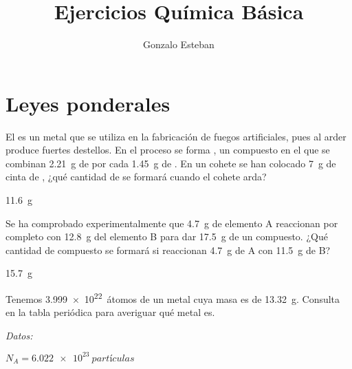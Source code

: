 \documentclass[10pt,a5paper,twoside]{article}
\title{Ejercicios Química Básica}
\author{Gonzalo Esteban}
\newenvironment{gexdatos}{
      \vspace{2pt}
      \noindent\small\textit{Datos:}
    }{\vspace{5pt}}
\begin{document}
\maketitle

\section{Leyes ponderales}

  \begin{exercise}[
      tags    = {termodinámica, entalpía, entalpia de reacción, calor},
      topics  = {química, termoquímica, termodinámica},
      source  = {FQ 1B SAN 2015, p42, e24},
    ]
    El  es un metal que se utiliza en la fabricación
    de fuegos artificiales, pues al arder produce fuertes
    destellos. En el proceso se forma , un compuesto
    en el que se combinan \SI{2.21}{\gram} de  por cada \SI{1.45}{\gram} de . En un cohete se han colocado \SI{7}{\gram} de cinta de , ¿qué cantidad de  se formará cuando el cohete arda?
  \end{exercise}

  \begin{solution}
    \SI{11.6}{\gram}
  \end{solution}




  \begin{exercise}[
      tags    = {termodinámica, entalpía, entalpia de reacción, calor},
      topics  = {química, termoquímica, termodinámica},
      source  = {FQ 1B OXF 2015, p42, e23},
    ]
    Se ha comprobado experimentalmente que \SI{4.7}{g} de elemento A reaccionan por completo con \SI{12.8}{\gram} del elemento B para dar \SI{17.5}{\gram} de un compuesto. ¿Qué cantidad de compuesto se formará si reaccionan \SI{4.7}{\gram} de A con \SI{11.5}{\gram} de B?
  \end{exercise}

  \begin{solution}
    \SI{15.7}{\gram}
  \end{solution}




  \begin{exercise}[
      tags    = {termodinámica, entalpía, entalpia de reacción, calor},
      topics  = {química, termoquímica, termodinámica},
      source  = {FQ 1B SAN 2015, p43, e34},
    ]
    Tenemos \SI{3.999e22}{átomos} de un metal cuya masa es de \SI{13.32}{\gram}. Consulta en la tabla periódica para averiguar
    qué metal es.

    \begin{gexdatos}
      \( N_A = \SI{6.022e23}{partículas}\)
    \end{gexdatos}
  \end{exercise}
\end{document}
